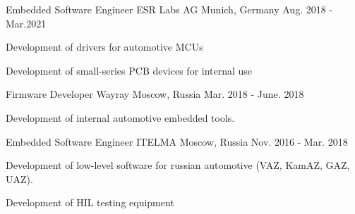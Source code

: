 \begin{cventries}
\cventry
{Embedded Software Engineer} %
{ESR Labs AG} %
{Munich, Germany} %
{Aug. 2018 - Mar.2021} %
{ %
\begin{cvitems}
\item {Development of drivers for automotive MCUs}
\item {Development of small-series PCB devices for internal use}
\end{cvitems}
}


\cventry
{Firmware Developer} %
{Wayray} %
{Moscow, Russia} %
{Mar. 2018 - June. 2018} %
{ %
\begin{cvitems}
\item {Development of internal automotive embedded tools.}
\end{cvitems}
}


\cventry
{Embedded Software Engineer} %
{ITELMA} %
{Moscow, Russia} %
{Nov. 2016 - Mar. 2018} %
{ %
\begin{cvitems}
\item {Development of low-level software for russian automotive (VAZ, KamAZ, GAZ, UAZ).}
\item {Development of HIL testing equipment}
\end{cvitems}
}


\end{cventries}